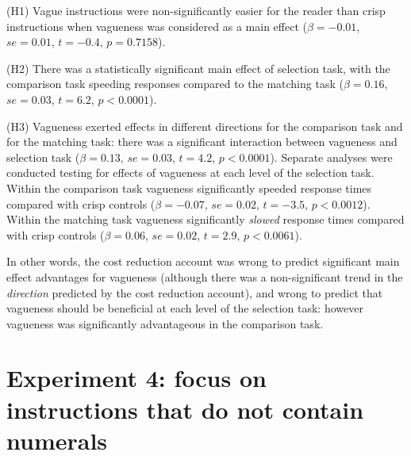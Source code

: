 \documentclass[%
man,		%
floatsintext,%
apacite%
]{apa6}
\begin{document}
{\small
\begin{APAenumerate}
	\item [(H1)] Vague instructions were non-significantly easier for the reader than crisp instructions when vagueness was considered as a main effect ($\beta=-0.01$, $se=0.01$, $t=-0.4$, $p=0.7158$). 
	\item [(H2)] There was a statistically significant main effect of selection task, with the comparison task speeding responses compared to the matching task ($\beta=0.16$, $se=0.03$, $t=6.2$, $p<0.0001$). 
	\item [(H3)] Vagueness exerted effects in different directions for the comparison task and for the matching task: there was a significant interaction between vagueness and selection task ($\beta=0.13$, $se=0.03$, $t=4.2$, $p<0.0001$). 
Separate analyses were conducted testing for effects of vagueness at each level of the selection task.
Within the comparison task vagueness significantly speeded response times compared with crisp controls ($\beta=-0.07$, $se=0.02$, $t=-3.5$, $p<0.0012$). 
Within the matching task vagueness significantly \emph{slowed} response times compared with crisp controls ($\beta=0.06$, $se=0.02$, $t=2.9$, $p<0.0061$). 
\end{APAenumerate}
}
In other words, the cost reduction account was wrong to predict significant main effect advantages for vagueness (although there was a non-significant trend in the \emph{direction} predicted by the cost reduction account), and wrong to predict that vagueness should be beneficial at each level of the selection task: however vagueness was significantly advantageous in the comparison task.



\section{Experiment 4: focus on instructions that do not contain numerals} %
\end{document}

